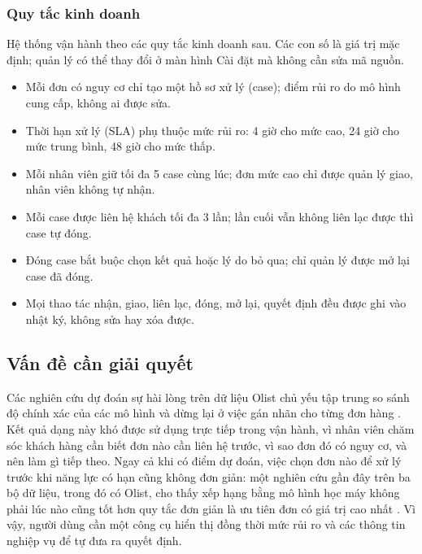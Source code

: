 \subsubsection{Quy tắc kinh doanh}

Hệ thống vận hành theo các quy tắc kinh doanh sau. Các con số là giá trị mặc định; quản lý có thể
thay đổi ở màn hình Cài đặt mà không cần sửa mã nguồn.

\begin{itemize}
    \item Mỗi đơn có nguy cơ chỉ tạo một hồ sơ xử lý (case); điểm rủi ro do mô hình cung cấp, không ai
    được sửa.
    \item Thời hạn xử lý (SLA) phụ thuộc mức rủi ro: 4 giờ cho mức cao, 24 giờ cho mức trung bình, 48
    giờ cho mức thấp.
    \item Mỗi nhân viên giữ tối đa 5 case cùng lúc; đơn mức cao chỉ được quản lý giao, nhân viên không
    tự nhận.
    \item Mỗi case được liên hệ khách tối đa 3 lần; lần cuối vẫn không liên lạc được thì case tự đóng.
    \item Đóng case bắt buộc chọn kết quả hoặc lý do bỏ qua; chỉ quản lý được mở lại case đã đóng.
    \item Mọi thao tác nhận, giao, liên lạc, đóng, mở lại, quyết định đều được ghi vào nhật ký, không
    sửa hay xóa được.
\end{itemize}

\subsection{Vấn đề cần giải quyết}

Các nghiên cứu dự đoán sự hài lòng trên dữ liệu Olist chủ yếu tập trung so sánh độ chính
xác của các mô hình và dừng lại ở việc gán nhãn cho từng đơn hàng \parencite{orman2026}.
Kết quả dạng này khó được sử dụng trực tiếp trong vận hành, vì nhân viên chăm sóc khách
hàng cần biết đơn nào cần liên hệ trước, vì sao đơn đó có nguy cơ, và nên làm gì tiếp theo.
Ngay cả khi có điểm dự đoán, việc chọn đơn nào để xử lý trước khi năng lực có hạn cũng
không đơn giản: một nghiên cứu gần đây trên ba bộ dữ liệu, trong đó có Olist, cho thấy
xếp hạng bằng mô hình học máy không phải lúc nào cũng tốt hơn quy tắc đơn giản là ưu tiên
đơn có giá trị cao nhất \parencite{li2026}. Vì vậy, người dùng cần một công cụ hiển thị
đồng thời mức rủi ro và các thông tin nghiệp vụ để tự đưa ra quyết định.


